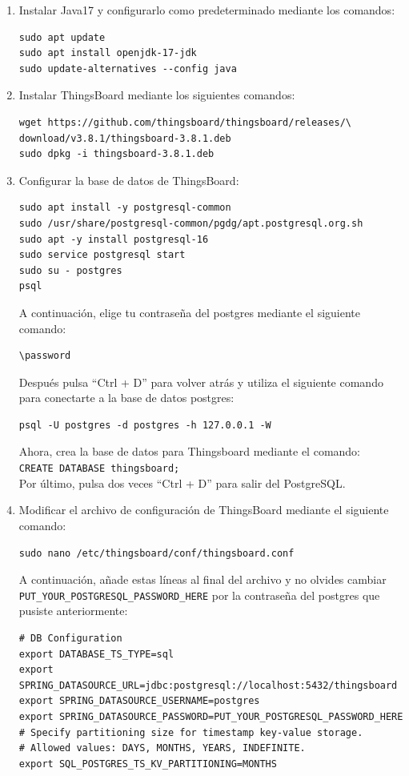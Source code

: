 \begin{enumerate}
    \item Instalar Java17 y configurarlo como predeterminado mediante los comandos:
    \begin{verbatim}
sudo apt update
sudo apt install openjdk-17-jdk
sudo update-alternatives --config java
    \end{verbatim}

    \item Instalar ThingsBoard mediante los siguientes comandos:
    \begin{verbatim}
wget https://github.com/thingsboard/thingsboard/releases/\
download/v3.8.1/thingsboard-3.8.1.deb
sudo dpkg -i thingsboard-3.8.1.deb
    \end{verbatim}

    \item Configurar la base de datos de ThingsBoard:
    \begin{verbatim}
sudo apt install -y postgresql-common
sudo /usr/share/postgresql-common/pgdg/apt.postgresql.org.sh
sudo apt -y install postgresql-16
sudo service postgresql start
sudo su - postgres
psql
    \end{verbatim}
    A continuación, elige tu contraseña del postgres mediante el siguiente comando:
    \begin{verbatim}
\password
    \end{verbatim}
    Después pulsa ``Ctrl + D'' para volver atrás y utiliza el siguiente comando para conectarte a la base de datos postgres:
    \begin{verbatim}
psql -U postgres -d postgres -h 127.0.0.1 -W
    \end{verbatim}
    Ahora, crea la base de datos para Thingsboard mediante el comando: \\
    \texttt{CREATE DATABASE thingsboard;} \\
    Por último, pulsa dos veces ``Ctrl + D'' para salir del PostgreSQL.

    \item Modificar el archivo de configuración de ThingsBoard mediante el siguiente comando:
    \begin{verbatim}
sudo nano /etc/thingsboard/conf/thingsboard.conf
    \end{verbatim}
    A continuación, añade estas líneas al final del archivo y no olvides cambiar \\
    \texttt{PUT\_YOUR\_POSTGRESQL\_PASSWORD\_HERE} por la contraseña del postgres que pusiste anteriormente:
    \begin{verbatim}
# DB Configuration
export DATABASE_TS_TYPE=sql
export SPRING_DATASOURCE_URL=jdbc:postgresql://localhost:5432/thingsboard
export SPRING_DATASOURCE_USERNAME=postgres
export SPRING_DATASOURCE_PASSWORD=PUT_YOUR_POSTGRESQL_PASSWORD_HERE
# Specify partitioning size for timestamp key-value storage.
# Allowed values: DAYS, MONTHS, YEARS, INDEFINITE.
export SQL_POSTGRES_TS_KV_PARTITIONING=MONTHS
    \end{verbatim}


\end{enumerate}
